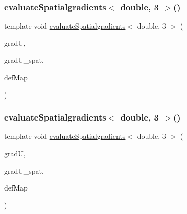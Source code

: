 \mbox{\label{function_evaluations_8cc_ac4df16de901d5280657a240a274e62a2}} 
\subsubsection{\texorpdfstring{evaluateSpatialgradients$<$ double, 3 $>$()}{evaluateSpatialgradients< double, 3 >()}\hspace{0.1cm}{\footnotesize\ttfamily [1/2]}}
{\footnotesize\ttfamily template void \mbox{\hyperlink{group___evaluation_functions_ga0b976342d491f6215953e2e65ea6a0de}{evaluate\+Spatialgradients}}$<$ double, 3 $>$ (\begin{DoxyParamCaption}\item[{Table$<$ 2, double $>$ \&}]{gradU,  }\item[{Table$<$ 2, double $>$}]{grad\+U\+\_\+spat,  }\item[{\mbox{\hyperlink{structdeformation_map}{deformation\+Map}}$<$ double, 3 $>$ \&}]{def\+Map }\end{DoxyParamCaption})}

\mbox{\label{function_evaluations_8cc_a9c17d7db3f0ade6c01cfb5450b958efc}} 
\subsubsection{\texorpdfstring{evaluateSpatialgradients$<$ double, 3 $>$()}{evaluateSpatialgradients< double, 3 >()}\hspace{0.1cm}{\footnotesize\ttfamily [2/2]}}
{\footnotesize\ttfamily template void \mbox{\hyperlink{group___evaluation_functions_ga0b976342d491f6215953e2e65ea6a0de}{evaluate\+Spatialgradients}}$<$ double, 3 $>$ (\begin{DoxyParamCaption}\item[{Table$<$ 3, double $>$ \&}]{gradU,  }\item[{Table$<$ 3, double $>$}]{grad\+U\+\_\+spat,  }\item[{\mbox{\hyperlink{structdeformation_map}{deformation\+Map}}$<$ double, 3 $>$ \&}]{def\+Map }\end{DoxyParamCaption})}

